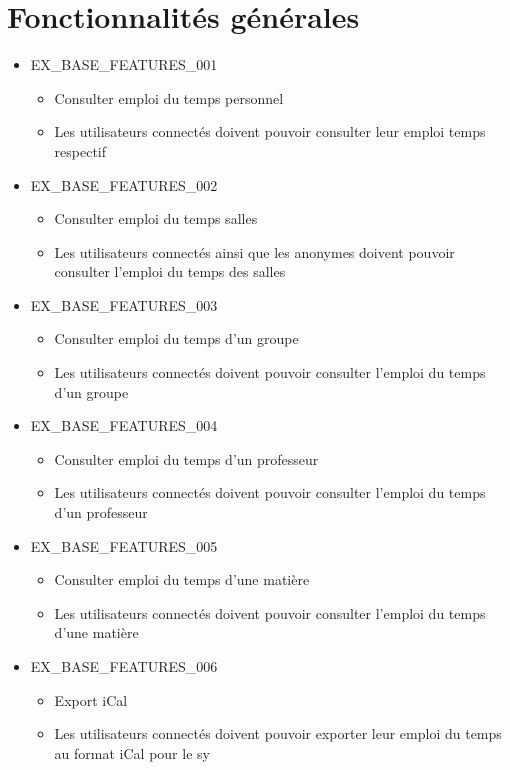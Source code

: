 \documentclass[french]{scrartcl}
\begin{document}
\section{Fonctionnalités générales}
    \begin{itemize}
        \item EX\_BASE\_FEATURES\_001
        \begin{itemize}
            \item Consulter emploi du temps personnel
            \item Les utilisateurs connectés doivent pouvoir consulter leur emploi temps respectif
        \end{itemize}

        \item EX\_BASE\_FEATURES\_002
        \begin{itemize}
            \item Consulter emploi du temps salles
            \item Les utilisateurs connectés ainsi que les anonymes doivent pouvoir consulter l'emploi du temps des salles
        \end{itemize}

        \item EX\_BASE\_FEATURES\_003
        \begin{itemize}
            \item Consulter emploi du temps d'un groupe
            \item Les utilisateurs connectés doivent pouvoir consulter l'emploi du temps d'un groupe
        \end{itemize}

        \item EX\_BASE\_FEATURES\_004
        \begin{itemize}
            \item Consulter emploi du temps d'un professeur
            \item Les utilisateurs connectés doivent pouvoir consulter l'emploi du temps d'un professeur
        \end{itemize}

        \item EX\_BASE\_FEATURES\_005
        \begin{itemize}
            \item Consulter emploi du temps d'une matière
            \item Les utilisateurs connectés doivent pouvoir consulter l'emploi du temps d'une matière
        \end{itemize}

        \item EX\_BASE\_FEATURES\_006
        \begin{itemize}
            \item Export iCal
            \item Les utilisateurs connectés doivent pouvoir exporter leur emploi du temps au format iCal pour le sy
        \end{itemize}
    \end{itemize}
\end{document}
